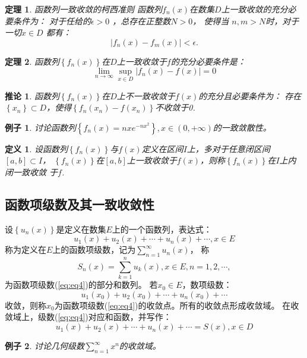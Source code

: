 \documentclass[a4paper,12pt]{article}
\newtheorem{theorem}{定理}
\newtheorem{definition}{定义}
\newtheorem{example}{例子}
\newtheorem{corollary}{推论}
\let\oldref\ref
\renewcommand{\ref}[1]{\rm{(\oldref{#1})}}
\begin{document}
\begin{theorem}{\rm 函数列一致收敛的柯西准则}
    函数列$f_n(x)$在数集$D$上一致收敛的充分必要条件为：
    对于任给的$\epsilon > 0$ ，总存在正整数$N > 0$， 使得当
    $n, m > N$时，对于一切$x \in D$ 都有：
    \begin{equation}
        \left|f_n(x) - f_m(x) \right| < \epsilon.
    \end{equation}
\end{theorem}

\begin{theorem}
    函数列$\left\{f_n(x)\right\}$在$D$上一致收敛于$f$的充分必要条件是：
    \begin{equation}
        \lim_{n \to \infty} \sup_{x \in D}\left|f_n(x) - f(x)\right| = 0
        \label{eq:eq3}
    \end{equation}
\end{theorem}

\begin{corollary}
    函数列$\left\{f_n(x)\right\}$在$D$上不一致收敛于$f(x)$的充分且必要条件为：
    存在$\left\{x_n\right\} \subset D$，使得$\left\{f_n(x_n) - f(x_n)\right\}$不收敛于0.
\end{corollary}

\begin{example}
    讨论函数列$\left\{f_n(x) = nxe^{-nx^2}\right\}, x \in (0, +\infty)$的一致敛散性。
\end{example}

\begin{definition}
    设函数列$\left\{f_n(x)\right\}$与$f(x)$定义在区间$I$上，多对于任意闭区间$[a,b] \subset I$，
    $\left\{f_n(x)\right\}$在$[a,b]$上一致收敛于$f(x)$，则称$\left\{f_n(x)\right\}$在$I$上内闭一致收敛
    于$f$.
\end{definition}

\subsection{函数项级数及其一致收敛性}
设$\left\{u_n(x)\right\}$是定义在数集$E$上的一个函数列，表达式：
\begin{equation}
    u_1(x) + u_2(x) + \cdots + u_n(x) + \cdots, x \in E
    \label{eq:eq4}
\end{equation}
称为定义在$E$上的函数项级数，记为$\displaystyle \sum_{n=1}^{\infty}u_n(x)$，
称
\begin{equation}
    S_n(x) = \sum_{k=1}^n u_k(x), x \in E, n = 1, 2, \cdots,
    \label{eq:eq5}
\end{equation}
为函数项级数\ref{eq:eq4}的部分和数列。
若$x_0 \in E$，数项级数：
\begin{equation}
    u_1(x_0) + u_2(x_0) + \cdots + u_n(x_0) + \cdots 
    \label{eq:eq6}
\end{equation}
收敛，则称$x_0$为函数项级数\ref{eq:eq4}的收敛点。所有的收敛点形成收敛域。
在收敛域上，级数\ref{eq:eq4}对应和函数，并写作：
\[
    u_1(x) + u_2(x) + \cdots + u_n(x) + \cdots = S(x), x \in D
    \]
\begin{example}
    讨论几何级数$\displaystyle \sum_{n=1}^{\infty}x^n$的收敛域。
\end{example}
\end{document}
